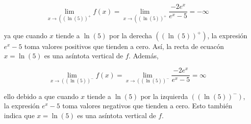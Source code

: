\begin{soluciones}
\begin{enumerate}[label=\alph*)]
    $$
    \lim _{x \rightarrow\left((\ln (5))^{+}\right.} f(x)=\lim _{x \rightarrow\left((\ln (5))^{+}\right.} \frac{-2 e^x}{e^x-5}=-\infty
    $$

    ya que cuando $x$ tiende a $\ln (5)$ por la derecha $\left((\ln (5))^{+}\right)$, la expresión $e^x-5$ toma valores positivos que tienden a cero. Así, la recta de ecuacón $x=\ln (5)$ es una asíntota vertical de $f$.
    Además,

    $$
    \lim _{x \rightarrow\left((\ln (5))^{-}\right.} f(x)=\lim _{x \rightarrow\left((\ln (5))^{-}\right.} \frac{-2 e^x}{e^x-5}=\infty
    $$

    ello debido a que cuando $x$ tiende a $\ln (5)$ por la izquierda $\left((\ln (5))^{-}\right)$, la expresión $e^x-5$ toma valores negativos que tienden a cero. Esto también indica que $x=\ln (5)$ es una asíntota vertical de $f$.
  \end{enumerate}
\end{soluciones}